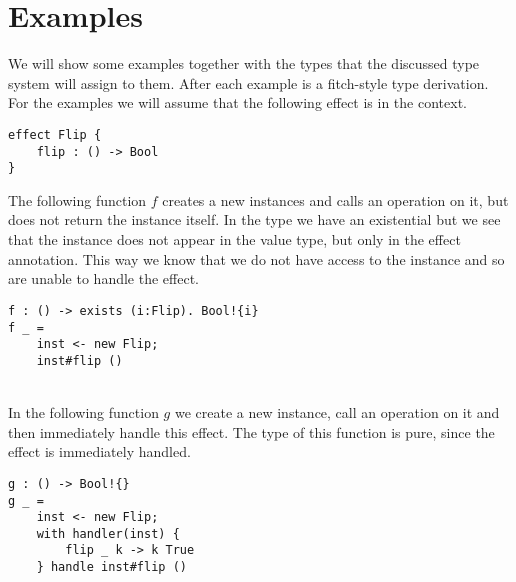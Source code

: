 \section{Examples}
We will show some examples together with the types that the discussed type system will assign to them.
After each example is a fitch-style type derivation.
For the examples we will assume that the following effect is in the context.
\begin{verbatim}
effect Flip {
	flip : () -> Bool
}
\end{verbatim}

The following function $f$ creates a new instances and calls an operation on it, but does not return the instance itself.
In the type we have an existential but we see that the instance does not appear in the value type, but only in the effect annotation. This way we know that we do not have access to the instance and so are unable to handle the effect.
\begin{verbatim}
f : () -> exists (i:Flip). Bool!{i}
f _ =
	inst <- new Flip;
	inst#flip ()
\end{verbatim}

\\

In the following function $g$ we create a new instance, call an operation on it and then immediately handle this effect.
The type of this function is pure, since the effect is immediately handled.
\begin{verbatim}
g : () -> Bool!{}
g _ =
	inst <- new Flip;
	with handler(inst) {
		flip _ k -> k True
	} handle inst#flip ()
\end{verbatim}

